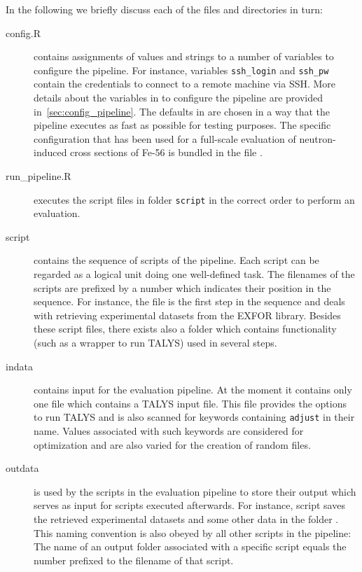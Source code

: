 \documentclass[12pt,a4paper]{scrartcl}
\begin{document}
 In the following we briefly discuss each of the files and directories in turn:
\begin{description}
\item[config.R]
contains assignments of values and strings to a number of variables to configure the pipeline.
For instance, variables \verb|ssh_login| and \verb|ssh_pw| contain the credentials to connect to a remote machine via SSH.
More details about the variables in  to configure the pipeline are provided in~\cref{sec:config_pipeline}.
The defaults in  are chosen in a way that the pipeline executes as fast as possible for testing purposes.
The specific configuration that has been used for a full-scale evaluation of neutron-induced cross sections of Fe-56 is bundled in the file .

\item[run\_pipeline.R]
executes the script files in folder \verb|script| in the correct order to perform an evaluation.
\item[script]
contains the sequence of scripts of the pipeline.
Each script can be regarded as a logical unit doing one well-defined task.
The filenames of the scripts are prefixed by a number which indicates their position in the sequence.
For instance, the file  is the first step in the sequence and deals with retrieving experimental datasets from the EXFOR library.
Besides these script files, there exists also a folder  which contains functionality (such as a wrapper to run TALYS) used in several steps.

\item[indata]
contains input for the evaluation pipeline.
At the moment it contains only one file  which contains a TALYS input file.
This file provides the options to run TALYS and is also scanned for keywords containing \verb|adjust| in their name.
Values associated with such keywords are considered for optimization and are also varied for the creation of random files.  

\item[outdata]
is used by the scripts in the evaluation pipeline to store their output which serves as input for scripts executed afterwards.
For instance, script  saves the retrieved experimental datasets and some other data in the folder .
This naming convention is also obeyed by all other scripts in the pipeline: The name of an output folder associated with a specific script equals the number prefixed to the filename of that script.

\end{description} 
 
\end{document}
